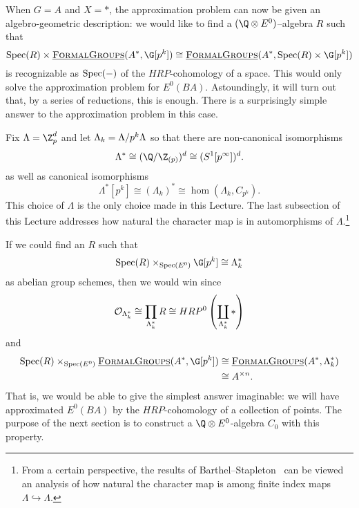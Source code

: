 When $G = A$ and $X = *$, the approximation problem can now be given an algebro-geometric description: we would like to find a $(\Q \otimes E^0)$--algebra $R$ such that 
\[
\Spec(R) \times \InternalHom{FormalGroups}(A^*, \G[p^k]) \cong  \InternalHom{FormalGroups}(A^*, \Spec(R) \times \G[p^k])
\]
is recognizable as $\operatorname{Spec}(-)$ of the $HRP$-cohomology of a space. This would only solve the approximation problem for $E^0(BA)$. Astoundingly, it will turn out that, by a series of reductions, this is enough. There is a surprisingly simple answer to the approximation problem in this case. 

Fix $\Lambda = \Z_{p}^{d}$ and let $\Lambda_k = \Lambda/p^k\Lambda$ so that there are non-canonical isomorphisms
\[
\Lambda^* \cong (\Q/\Z_{(p)})^d \cong (S^1[p^{\infty}])^d.
\] 
as well as canonical isomorphisms
\[
\Lambda^*[p^k] \cong (\Lambda_{k})^* \cong \hom(\Lambda_k, C_{p^k}).
\]
This choice of $\Lambda$ is the only choice made in this Lecture. The last subsection of this Lecture addresses how natural the character map is in automorphisms of $\Lambda$.\footnote{From a certain perspective, the results of Barthel--Stapleton~\cite{BarthelStapleton} can be viewed an analysis of how natural the character map is among finite index maps $\Lambda \hookrightarrow \Lambda$.}

If we could find an $R$ such that
\[
\Spec(R) \times_{\Spec(E^0)} \G[p^k] \cong \Lk^*
\]
as abelian group schemes, then we would win since
\[
\mathcal{O}_{\Lambda_k^*} \cong \prod_{\Lambda_k^*} R \cong HRP^0\left(\coprod_{\Lambda_k^*} \ast\right)
\]
and
\begin{align*}
\Spec(R) \times_{\Spec(E^0)} \InternalHom{FormalGroups}(A^*, \G[p^k]) & \cong \InternalHom{FormalGroups}(A^*, \Lambda_{k}^*) \\
& \cong A^{\times n}.
\end{align*}
That is, we would be able to give the simplest answer imaginable: we will have approximated $E^0(BA)$ by the $HRP$-cohomology of a collection of points. The purpose of the next section is to construct a $\Q \otimes E^0$-algebra $C_0$ with this property.




